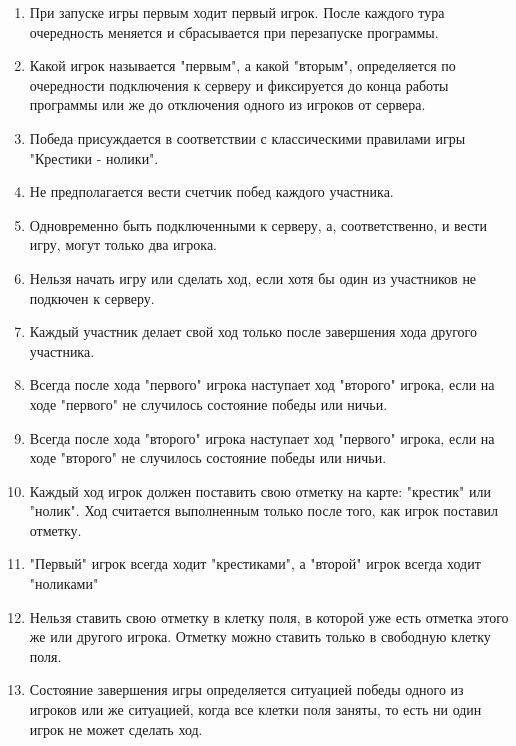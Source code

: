 
\begin{enumerate}

	\item При запуске игры первым ходит первый игрок. После каждого тура очередность меняется и сбрасывается при перезапуске программы. 

	\item Какой игрок называется "первым", а какой "вторым", определяется по очередности подключения к серверу и фиксируется до конца работы программы или же до отключения одного из игроков от сервера.

	\item Победа присуждается в соответствии с классическими правилами игры "Крестики - нолики".
	
	\item Не предполагается вести счетчик побед каждого участника.
	
	\item Одновременно быть подключенными к серверу, а, соответственно, и вести игру, могут только два игрока.
	
	\item Нельзя начать игру или сделать ход, если хотя бы один из участников не подкючен к серверу.
	
	\item Каждый участник делает свой ход только после завершения хода другого участника.
	
	\item Всегда после хода "первого" игрока наступает ход "второго" игрока, если на ходе "первого" не случилось состояние победы или ничьи.
	
	\item Всегда после хода "второго" игрока наступает ход "первого" игрока, если на ходе "второго" не случилось состояние победы или ничьи.
	
	\item Каждый ход игрок должен поставить свою отметку на карте: "крестик" или "нолик". Ход считается выполненным только после того, как игрок поставил отметку.
	
	\item "Первый" игрок всегда ходит "крестиками", а "второй" игрок всегда ходит "ноликами"
	
	\item Нельзя ставить свою отметку в клетку поля, в которой уже есть отметка этого же или другого игрока. Отметку можно ставить только в свободную клетку поля.
	
	\item Состояние завершения игры определяется ситуацией победы одного из игроков или же ситуацией, когда все клетки поля заняты, то есть ни один игрок не может сделать ход.
	

\end{enumerate}
